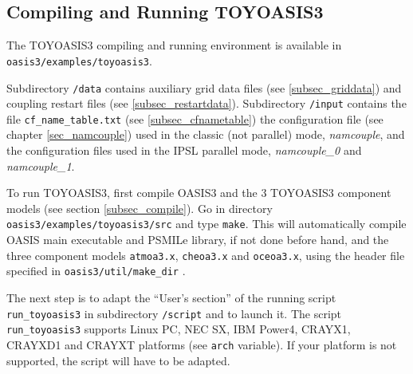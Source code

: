 \subsection{Compiling and Running TOYOASIS3}
\label{subsec_running_toyoasis3}

The TOYOASIS3 compiling and running environment is available in {\tt
  oasis3/examples/toyoasis3}.  

Subdirectory {\tt /data} contains auxiliary grid data files (see
\ref{subsec_griddata}) and coupling restart files (see
\ref{subsec_restartdata}). Subdirectory {\tt /input} contains the file
{\tt cf\_name\_table.txt} (see \ref{subsec_cfnametable}) the
configuration file (see chapter \ref{sec_namcouple}) used in the
classic (not parallel) mode, {\it namcouple}, and the
configuration files used in the IPSL parallel mode, 
{\it namcouple\_0} and {\it namcouple\_1}.

To run TOYOASIS3, first compile OASIS3 and the 3 TOYOASIS3 component
models (see section \ref{subsec_compile}). 
Go in directory {\tt oasis3/examples/toyoasis3/src} and type
{\tt make}.  This will automatically compile OASIS main executable and
PSMILe library, if not done before hand, and the three component
models {\tt atmoa3.x}, {\tt cheoa3.x} and {\tt oceoa3.x}, using the
header file specified in {\tt oasis3/util/make\_dir} .

The next step is to adapt the ``User's section'' of the running script
{\tt run\_toyoasis3} in subdirectory {\tt /script} and to launch it.
The script {\tt run\_toyoasis3} supports Linux PC, NEC SX, IBM
Power4, CRAYX1, CRAYXD1 and CRAYXT platforms (see {\tt arch}
variable). If your platform is not supported, the script will
have to be adapted.


